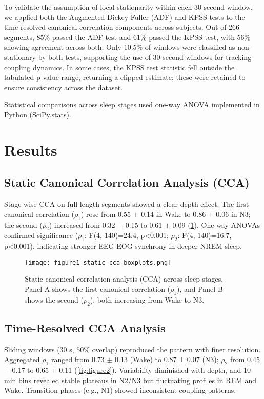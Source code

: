 To validate the assumption of local stationarity within each 30-second window, we applied both the Augmented Dickey-Fuller (ADF) and KPSS tests to the time-resolved canonical correlation components across subjects. Out of 266 segments, 85\% passed the ADF test and 61\% passed the KPSS test, with 56\% showing agreement across both. Only 10.5\% of windows were classified as non-stationary by both tests, supporting the use of 30-second windows for tracking coupling dynamics. In some cases, the KPSS test statistic fell outside the tabulated p-value range, returning a clipped estimate; these were retained to ensure consistency across the dataset.

Statistical comparisons across sleep stages used one-way ANOVA implemented in Python (SciPy.stats).

\section{Results}

\subsection{Static Canonical Correlation Analysis (CCA)}

Stage-wise CCA on full-length segments showed a clear depth effect. The first canonical correlation ($\rho_1$) rose from 0.55 $\pm$ 0.14 in Wake to 0.86 $\pm$ 0.06 in N3; the second ($\rho_2$) increased from 0.32 $\pm$ 0.15 to 0.61 $\pm$ 0.09 (\ref{fig:figure1}). One-way ANOVAs confirmed significance ($\rho_1$: F(4, 140)=24.4, p<0.001; $\rho_2$: F(4, 140)=16.7, p<0.001), indicating stronger EEG-EOG synchrony in deeper NREM sleep.

\begin{figure}
\centering
\texttt{[image: figure1\_static\_cca\_boxplots.png]} %
\caption{Static canonical correlation analysis (CCA) across sleep stages. Panel A shows the first canonical correlation ($\rho_1$), and Panel B shows the second ($\rho_2$), both increasing from Wake to N3.}\label{fig:figure1}
\end{figure}

\subsection{Time-Resolved CCA Analysis}

Sliding windows (30 s, $50\%$ overlap) reproduced the pattern with finer resolution. Aggregated $\rho_1$ ranged from 0.73 $\pm$ 0.13 (Wake) to 0.87 ± 0.07 (N3); $\rho_2$ from 0.45 $\pm$ 0.17 to 0.65 $\pm$ 0.11 (\ref{fig:figure2}). Variability diminished with depth, and 10-min bins revealed stable plateaus in N2/N3 but fluctuating profiles in REM and Wake. Transition phases (e.g., N1) showed inconsistent coupling patterns.

